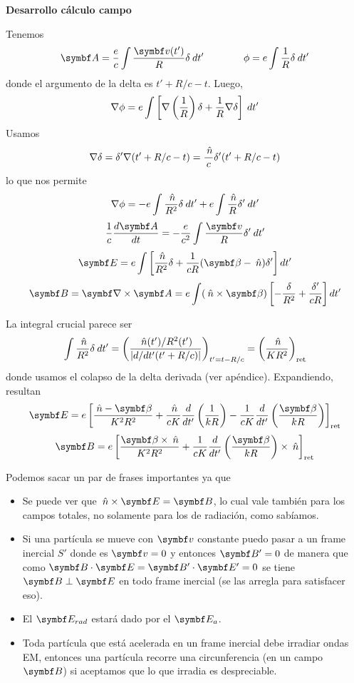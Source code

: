 \documentclass[10pt,oneside]{CBFT_book}
\begin{document}
\begin{ejemplo}{\bf Desarrollo cálculo campo}

Tenemos 
\[
	\vb A = \frac{e}{c} \int \frac{\vb v(t')}{R} \delta \: dt' \qquad \qquad 
	\phi = e \int \frac{1}{R} \delta \: dt'
\]
donde el argumento de la delta es $t'+ R/c -t$. Luego,
\[
	\nabla\phi = e \int \left[ \nabla\left( \frac{ 1 }{ R } \right) \delta + \frac{1}{R} \nabla\delta \right] \: dt'
\]
Usamos
\[
	\nabla\delta = \delta'\nabla(t'+R/c-t) = \frac{\:\hat{n}}{c}\delta'(t'+R/c-t)
\]
lo que nos permite
\[
	\nabla\phi = -e \int \frac{\:\hat{n}}{R^2} \delta \: dt' + 
	e \int \frac{\:\hat{n}}{R} \delta' \: dt'
\]
\[
	\frac{1}{c}\dtot{\vb A}{t} = - \frac{e}{c^2} \int \frac{\vb v}{R} \delta' \: dt' 
\]
\[
	\vb E = e \int \left[ \frac{\nver}{R^2} \delta + 
	\frac{1}{cR}(\vb{\beta} - \nver) \delta' \right] dt' 
\]
\[
	\vb B = \rotorm{A} = e \int (\nver\times\vb{\beta}) 
	\left[ -\frac{\delta}{R^2} + \frac{\delta'}{cR} \right] dt' 
\] 

La integral crucial parece ser
\[
	\int \frac{\:\hat{n}}{R^2} \delta \: dt' = 
	\left( \frac{  \:\hat{n}(t')/R^2(t')  }{ |d/dt'(t'+R/c)| } \right)_{t' = t-R/c} =
	\left( \frac{ \:\hat{n} }{ KR^2 } \right)_{\text{ret}}
\] 
donde usamos el colapso de la delta derivada (ver apéndice). 
Expandiendo, resultan
\[
	\vb E = e \left[ \frac{\nver - \vb{\beta} }{K^2R^2} + \frac{\nver}{cK} \dtot{}{t'}\Frac{1}{kR}
	- \frac{1}{cK}  \dtot{}{t'}\Frac{\vb{\beta}}{kR} \right]_{\text{ret}}
\]
\[
	\vb B = e \left[ \frac{ \vb{\beta}\times\nver }{K^2R^2} 
	+ \frac{1}{cK} \dtot{}{t'}\Frac{\vb{\beta}}{kR}\times\nver \right]_{\text{ret}}
\]
 
 
\end{ejemplo}


Podemos sacar un par de frases importantes ya que 
\begin{itemize}
	\item Se puede ver que $\nver\times\vb E = \vb B$, lo cual vale también para 
	los campos totales, no solamente para los de radiación, como sabíamos.
	\item Si una partícula se mueve con $\vb{v}$ constante puedo pasar a un frame 
	inercial $S'$ donde es $\vb{v}=0$ y entonces $\vb{B}'=0$ de manera que como 
	$\pe{B}{E}=\pe{B'}{E'}=0$ se tiene $\vb{B}\perp\vb{E}$ en todo frame inercial
	(se las arregla para satisfacer eso).
	\item El $\vb{E}_{rad}$ estará dado por el $\vb{E}_a$.
	\item Toda partícula que está acelerada en un frame inercial debe irradiar ondas
	EM, entonces una partícula recorre una circunferencia (en un campo $\vb{B}$) si 
	aceptamos que lo que irradia es despreciable.
\end{itemize}
\end{document}
